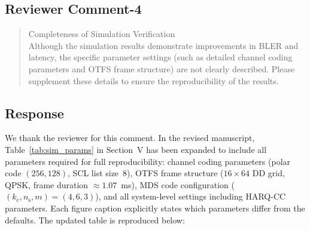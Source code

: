 \subsection{Reviewer Comment-4}



\begin{mdframed}
\begin{quote}

Completeness of Simulation Verification \\
   Although the simulation results demonstrate improvements in BLER and latency, the specific parameter settings (such as detailed channel coding parameters and OTFS frame structure) are not clearly described. Please supplement these details to ensure the reproducibility of the results.

\end{quote}

\end{mdframed}


\subsection{Response}

We thank the reviewer for this comment. In the revised manuscript, Table~\ref{tab:sim_params} in Section~V has been expanded to include all parameters required for full reproducibility: channel coding parameters (polar code $(256,128)$, SCL list size~8), OTFS frame structure ($16 \times 64$ DD grid, QPSK, frame duration $\approx 1.07$~ms), MDS code configuration ($(k_{\mathrm{c}}, n_{\mathrm{s}}, m) = (4,6,3)$), and all system-level settings including HARQ-CC parameters. Each figure caption explicitly states which parameters differ from the defaults. The updated table is reproduced below:


